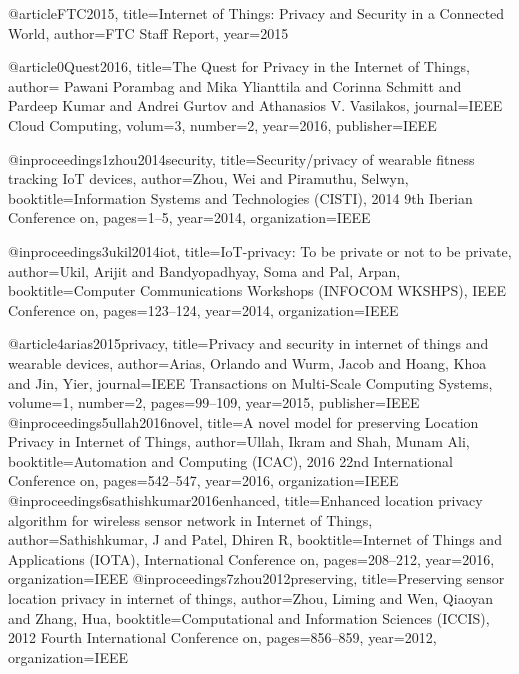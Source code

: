 {{{{{{%




@article{FTC2015,
  title={Internet of Things: Privacy and Security in a Connected World},
  author={FTC Staff Report},
  year={2015}
}



@article{0Quest2016,
  title={The Quest for Privacy in the Internet of Things},
  author={ Pawani Porambag and Mika Ylianttila and Corinna Schmitt and  Pardeep Kumar and  Andrei Gurtov and  Athanasios V. Vasilakos},
  journal={IEEE Cloud Computing},
  volum={3},
  number={2},
  year={2016},
  publisher={IEEE}
}

@inproceedings{1zhou2014security,
  title={Security/privacy of wearable fitness tracking {I}o{T} devices},
  author={Zhou, Wei and Piramuthu, Selwyn},
  booktitle={Information Systems and Technologies (CISTI), 2014 9th Iberian Conference on},
  pages={1--5},
  year={2014},
  organization={IEEE}
}


@inproceedings{3ukil2014iot,
  title={{I}o{T}-privacy: To be private or not to be private},
  author={Ukil, Arijit and Bandyopadhyay, Soma and Pal, Arpan},
  booktitle={Computer Communications Workshops (INFOCOM WKSHPS), IEEE Conference on},
  pages={123--124},
  year={2014},
  organization={IEEE}
}


@article{4arias2015privacy,
  title={Privacy and security in internet of things and wearable devices},
  author={Arias, Orlando and Wurm, Jacob and Hoang, Khoa and Jin, Yier},
  journal={IEEE Transactions on Multi-Scale Computing Systems},
  volume={1},
  number={2},
  pages={99--109},
  year={2015},
  publisher={IEEE}
}
@inproceedings{5ullah2016novel,
  title={A novel model for preserving Location Privacy in Internet of Things},
  author={Ullah, Ikram and Shah, Munam Ali},
  booktitle={Automation and Computing (ICAC), 2016 22nd International Conference on},
  pages={542--547},
  year={2016},
  organization={IEEE}
}
@inproceedings{6sathishkumar2016enhanced,
  title={Enhanced location privacy algorithm for wireless sensor network in Internet of Things},
  author={Sathishkumar, J and Patel, Dhiren R},
  booktitle={Internet of Things and Applications (IOTA), International Conference on},
  pages={208--212},
  year={2016},
  organization={IEEE}
}
@inproceedings{7zhou2012preserving,
  title={Preserving sensor location privacy in internet of things},
  author={Zhou, Liming and Wen, Qiaoyan and Zhang, Hua},
  booktitle={Computational and Information Sciences (ICCIS), 2012 Fourth International Conference on},
  pages={856--859},
  year={2012},
  organization={IEEE}
}

}}}}}}

